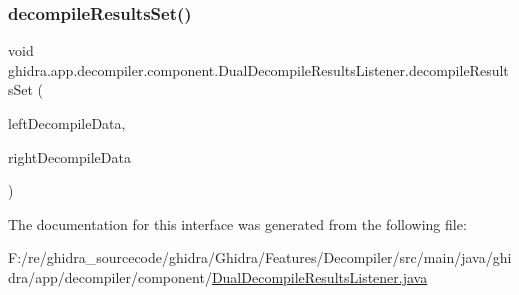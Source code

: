 \subsubsection{\texorpdfstring{decompileResultsSet()}{decompileResultsSet()}}
{\footnotesize\ttfamily void ghidra.\+app.\+decompiler.\+component.\+Dual\+Decompile\+Results\+Listener.\+decompile\+Results\+Set (\begin{DoxyParamCaption}\item[{\mbox{\hyperlink{classghidra_1_1app_1_1decompiler_1_1component_1_1_decompile_data}{Decompile\+Data}}}]{left\+Decompile\+Data,  }\item[{\mbox{\hyperlink{classghidra_1_1app_1_1decompiler_1_1component_1_1_decompile_data}{Decompile\+Data}}}]{right\+Decompile\+Data }\end{DoxyParamCaption})}



The documentation for this interface was generated from the following file\+:\begin{DoxyCompactItemize}
\item 
F\+:/re/ghidra\+\_\+sourcecode/ghidra/\+Ghidra/\+Features/\+Decompiler/src/main/java/ghidra/app/decompiler/component/\mbox{\hyperlink{_dual_decompile_results_listener_8java}{Dual\+Decompile\+Results\+Listener.\+java}}\end{DoxyCompactItemize}
